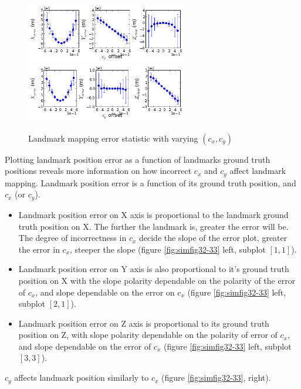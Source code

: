 \begin{figure}[h]
  \centering
  \includegraphics[width=7cm, keepaspectratio=true]{./Figures/SimulationFigures/Figure28.png}
  \includegraphics[width=7cm, keepaspectratio=true]{./Figures/SimulationFigures/Figure29.png}
  \caption{Landmark mapping error statistic with varying $(c_x, c_y)$}
  \label{fig:simfig28-29}
\end{figure}

Plotting landmark position error as a function of landmarks ground truth positions reveals more information on how incorrect $c_{x}$ and $c_{y}$ affect landmark mapping. Landmark position error is a function of its ground truth position, and $c_{x}$ (or $c_{y}$).

\begin{itemize}
  \item Landmark position error on X axis is proportional to the landmark ground truth position on X. The further the landmark is, greater the error will be. The degree of incorrectness in $c_{x}$ decide the slope of the error plot, greater the error in $c_{x}$, steeper the slope (figure \ref{fig:simfig32-33} left, subplot $[1,1]$).
  \item Landmark position error on Y axis is also proportional to it's ground truth position on X with the slope polarity dependable on the polarity of the error of $c_{x}$, and slope dependable on the error on $c_{x}$ (figure \ref{fig:simfig32-33} left, subplot $[2,1]$).
  \item Landmark position error on Z axis is proportional to its ground truth position on Z, with slope polarity dependable on the polarity of error of $c_{x}$, and slope dependable on the error of $c_{x}$ (figure \ref{fig:simfig32-33} left, subplot $[3,3]$).
\end{itemize}

$c_{y}$ affects landmark position similarly to $c_{x}$ (figure \ref{fig:simfig32-33}, right).

